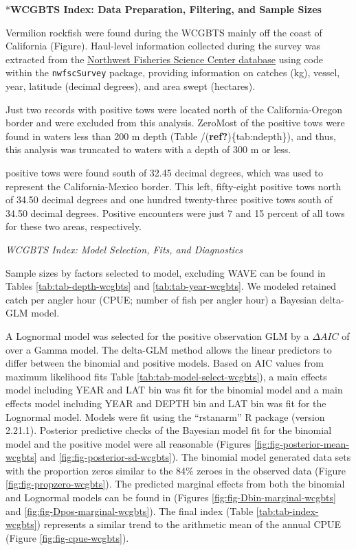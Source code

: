 \documentclass[11pt,
  english,
  a4paper,
]{article}
\begin{document}
*\textbf{WCGBTS Index: Data Preparation, Filtering, and Sample Sizes}

Vermilion rockfish were found during the WCGBTS mainly off the coast of California (Figure). Haul-level information collected during the survey was extracted from the {\href{https://www.webapps.nwfsc.noaa.gov/data}{Northwest Fisheries Science Center database}\leavevmode\tagmcend\tagstructend} using code within the \texttt{nwfscSurvey} package, providing information on catches (kg), vessel, year, latitude (decimal degrees), and area swept (hectares).

Just two records with positive tows were located north of the California-Oregon border and were excluded from this analysis. ZeroMost of the positive tows were found in waters less than 200 m depth (Table /{(\textbf{ref?})\leavevmode\tagmcend\tagstructend}\{tab:ndepth\}), and thus, this analysis was truncated to waters with a depth of 300 m or less.

positive tows were found south of 32.45 decimal degrees, which was used to represent the California-Mexico border. This left, fifty-eight positive tows north of 34.50 decimal degrees and one hundred twenty-three positive tows south of 34.50 decimal degrees. Positive encounters were just 7 and 15 percent of all tows for these two areas, respectively.

\emph{WCGBTS Index: Model Selection, Fits, and Diagnostics}

Sample sizes by factors selected to model, excluding WAVE can be found in Tables \ref{tab:tab-depth-wcgbts} and \ref{tab:tab-year-wcgbts}. We modeled retained catch per angler hour (CPUE; number of fish per angler hour) a Bayesian delta-GLM model.

A Lognormal model was selected for the positive observation GLM by a {\(\Delta AIC\)\leavevmode\tagmcend\tagstructend} of\\
over a Gamma model. The delta-GLM method allows the linear predictors to differ between the binomial and positive models. Based on AIC values from maximum likelihood fits Table \ref{tab:tab-model-select-wcgbts}), a main effects model including YEAR and LAT bin was fit for the binomial model and a main effects model including YEAR and DEPTH bin and LAT bin was fit for the Lognormal model. Models were fit using the ``rstanarm'' R package (version 2.21.1). Posterior predictive checks of the Bayesian model fit for the binomial model and the positive model were all reasonable (Figures \ref{fig:fig-posterior-mean-wcgbts} and \ref{fig:fig-posterior-sd-wcgbts}). The binomial model generated data sets with the proportion zeros similar to the 84\% zeroes in the observed data (Figure \ref{fig:fig-propzero-wcgbts}). The predicted marginal effects from both the binomial and Lognormal models can be found in (Figures \ref{fig:fig-Dbin-marginal-wcgbts} and \ref{fig:fig-Dpos-marginal-wcgbts}). The final index (Table \ref{tab:tab-index-wcgbts}) represents a similar trend to the arithmetic mean of the annual CPUE (Figure \ref{fig:fig-cpue-wcgbts}).
\end{document}
